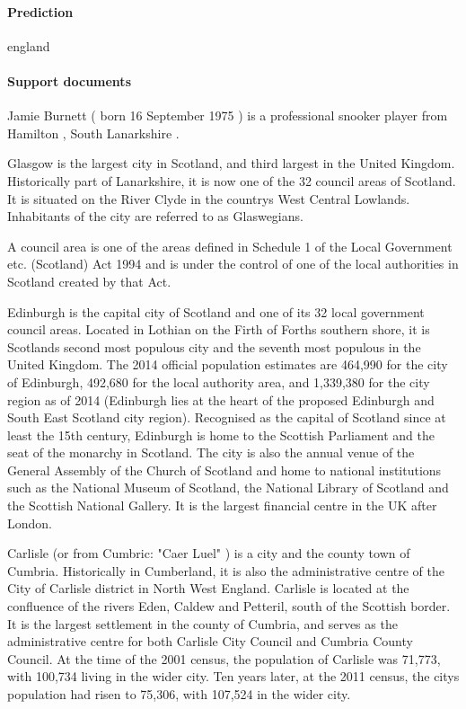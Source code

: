 \documentclass{article} \usepackage{iclr2019_conference,times}
\begin{document}
\paragraph{Prediction}
england

\paragraph{Support documents}

Jamie Burnett ( born 16 September 1975 ) is a professional snooker player from Hamilton , South Lanarkshire .

Glasgow  is the largest city in Scotland, and third largest in the United Kingdom. Historically part of Lanarkshire, it is now one of the 32 council areas of Scotland. It is situated on the River Clyde in the countrys West Central Lowlands. Inhabitants of the city are referred to as Glaswegians.

A council area is one of the areas defined in Schedule 1 of the Local Government etc. (Scotland) Act 1994 and is under the control of one of the local authorities in Scotland created by that Act.

Edinburgh is the capital city of Scotland and one of its 32 local government council areas. Located in Lothian on the Firth of Forths southern shore, it is Scotlands second most populous city and the seventh most populous in the United Kingdom. The 2014 official population estimates are 464,990 for the city of Edinburgh, 492,680 for the local authority area, and 1,339,380 for the city region as of 2014 (Edinburgh lies at the heart of the proposed Edinburgh and South East Scotland city region). Recognised as the capital of Scotland since at least the 15th century, Edinburgh is home to the Scottish Parliament and the seat of the monarchy in Scotland. The city is also the annual venue of the General Assembly of the Church of Scotland and home to national institutions such as the National Museum of Scotland, the National Library of Scotland and the Scottish National Gallery. It is the largest financial centre in the UK after London.

Carlisle (or from Cumbric: "Caer Luel" ) is a city and the county town of Cumbria. Historically in Cumberland, it is also the administrative centre of the City of Carlisle district in North West England. Carlisle is located at the confluence of the rivers Eden, Caldew and Petteril, south of the Scottish border. It is the largest settlement in the county of Cumbria, and serves as the administrative centre for both Carlisle City Council and Cumbria County Council. At the time of the 2001 census, the population of Carlisle was 71,773, with 100,734 living in the wider city. Ten years later, at the 2011 census, the citys population had risen to 75,306, with 107,524 in the wider city.
\end{document}
